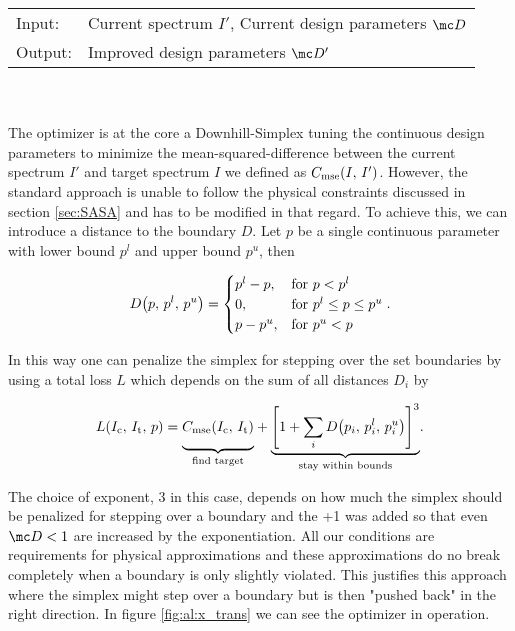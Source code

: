 \begin{tabular}{ll}
    \toprule
    Input: &
    Current spectrum $I'$, 
    Current design parameters $\mc D$\\
    Output: & 
    Improved design parameters $\mc D'$\\
    \bottomrule
\end{tabular}
\\
\\
The optimizer is at the core a Downhill-Simplex \cite{Nelder1965} tuning the continuous design parameters to minimize the mean-squared-difference between the current spectrum $I'$ and target spectrum $I$ we defined as 
$C_{\mathrm{mse}}\qty(I, \, I')$.
However, the standard approach is unable to follow the physical constraints discussed in section \ref{sec:SASA} and has to be modified in that regard. To achieve this, we can introduce a distance to the boundary $D$. Let $p$ be a single continuous parameter with lower bound $p^l$ and upper bound $p^u$, then

\begin{equation}
    D\qty(p, \, p^l, \, p^u) =
    \begin{cases}
        p^l - p, & \text{for } p < p^l\\
        0, & \text{for } p^l \leq p \leq p^u\\
        p - p^u, & \text{for } p^u < p
    \end{cases}.
\end{equation}

\noindent
In this way one can penalize the simplex for stepping over the set boundaries by using a total loss $L$ which depends on the sum of all distances $D_i$ by

\begin{equation}\label{eq:al:simlex_loss}
    L(I_\s{c}, \,I_\s{t}, \,p) =
    {\underbrace{%
    \vphantom{ \left(\frac{a^{0.3}}{b}\right) }
    C_\s{mse}(I_\s{c}, \, I_\s{t})}_{\text{find target}}}
    +
    {\underbrace{%
    \qty[1 + \sum_i D\qty(p_i, \, p_i^l, \, p_i^u)]^3
    }_{\text{stay within bounds}}}.
\end{equation}

The choice of exponent, 3 in this case, depends on how much the simplex should be penalized for stepping over a boundary and the +1 was added so that even $\mc D < 1$ are increased by the exponentiation.
All our conditions are requirements for physical approximations and these approximations do no break completely when a boundary is only slightly violated. This justifies this approach where the simplex might step over a boundary but is then "pushed back" in the right direction. In figure \ref{fig:al:x_trans} we can see the optimizer in operation.
\\

